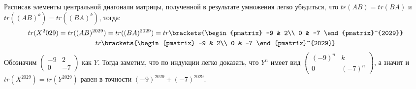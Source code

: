 Расписав элементы центральной диагонали матрицы, полученной в результате умножения легко убедиться, что $tr(AB) = tr(BA)$ и $tr((AB)^k) = tr((BA)^k)$, тогда:
\begin{gather*}
    tr(X^2029) = tr((AB)^{2029}) = tr((BA)^{2029}) = tr\brackets{\begin{pmatrix}
        -9 & 2\\ 0 & -7
    \end{pmatrix}^{2029}}\\
    tr\brackets{\begin{pmatrix}
        -9 & 2\\ 0 & -7
    \end{pmatrix}^{2029}}
\end{gather*}
Обозначим $\begin{pmatrix}
               -9 & 2\\ 0 & -7
          \end{pmatrix}$ как $Y$. Тогда заметим, что по индукции легко доказать, что $Y^n$ имеет вид $\begin{pmatrix}
                   (-9)^n & k\\ 0 & (-7)^n
               \end{pmatrix}$, а значит и $tr(X^{2029}) = tr(Y^{2029})$ равен в точности $(-9)^{2029} + (-7)^{2029}$.